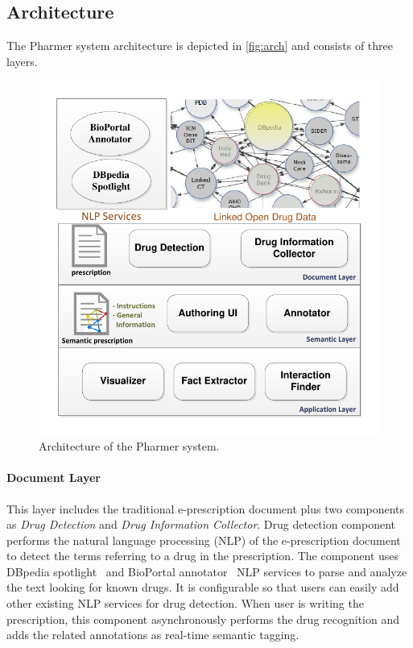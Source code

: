\documentclass[10pt, conference, compsocconf]{IEEEtran}
\begin{document}
\subsection{Architecture}

The Pharmer system architecture is depicted in \autoref{fig:arch} and consists of three layers.

\begin{figure}[tb]
	\centering
		\includegraphics[width=1.0\columnwidth]{images/architecture.pdf}
	\caption{Architecture of the Pharmer system.}
	\label{fig:arch}
\end{figure}

\paragraph{Document Layer} This layer includes the traditional e-prescription document plus two components as \emph{Drug Detection} and \emph{Drug Information Collector}.
Drug detection component performs the natural language processing (NLP) of the e-prescription document to detect the terms referring to a drug in the prescription.
The component uses DBpedia spotlight~\cite{dbspotlight} and BioPortal annotator~\cite{bioportal} NLP services to parse and analyze the text looking for known drugs.
It is configurable so that users can easily add other existing NLP services for drug detection.
When user is writing the prescription, this component asynchronously performs the drug recognition and adds the related annotations as real-time semantic tagging.
\end{document}
